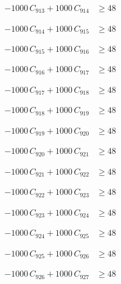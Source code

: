 \documentclass[a4paper,11pt]{article}
\begin{document}
\begin{align}
-1000\,C_{913} + 1000\,C_{914} &\geq 48 \nonumber
\end{align}

\begin{align}
-1000\,C_{914} + 1000\,C_{915} &\geq 48 \nonumber
\end{align}

\begin{align}
-1000\,C_{915} + 1000\,C_{916} &\geq 48 \nonumber
\end{align}

\begin{align}
-1000\,C_{916} + 1000\,C_{917} &\geq 48 \nonumber
\end{align}

\begin{align}
-1000\,C_{917} + 1000\,C_{918} &\geq 48 \nonumber
\end{align}

\begin{align}
-1000\,C_{918} + 1000\,C_{919} &\geq 48 \nonumber
\end{align}

\begin{align}
-1000\,C_{919} + 1000\,C_{920} &\geq 48 \nonumber
\end{align}

\begin{align}
-1000\,C_{920} + 1000\,C_{921} &\geq 48 \nonumber
\end{align}

\begin{align}
-1000\,C_{921} + 1000\,C_{922} &\geq 48 \nonumber
\end{align}

\begin{align}
-1000\,C_{922} + 1000\,C_{923} &\geq 48 \nonumber
\end{align}

\begin{align}
-1000\,C_{923} + 1000\,C_{924} &\geq 48 \nonumber
\end{align}

\begin{align}
-1000\,C_{924} + 1000\,C_{925} &\geq 48 \nonumber
\end{align}

\begin{align}
-1000\,C_{925} + 1000\,C_{926} &\geq 48 \nonumber
\end{align}

\begin{align}
-1000\,C_{926} + 1000\,C_{927} &\geq 48 \nonumber
\end{align}
\end{document}
